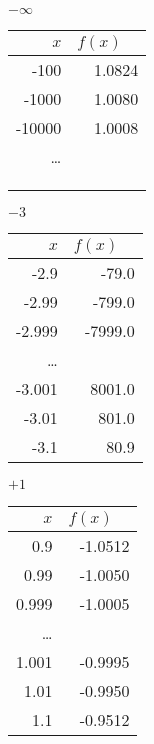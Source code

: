 \begin{esempio}
\begin{minipage}{.24\textwidth}
\begin{center}
\(-\infty\)\\
\begin{tabular}{r|r}
\(x\) & \(f(x)\quad\)\\\hline
-100 & 1.0824 \\
-1000 & 1.0080 \\
-10000 & 1.0008 \\
\dots \\
&\\
&\\
&
\end{tabular}
\end{center}
\end{minipage}
\begin{minipage}{.24\textwidth}
\begin{center}
\(-3\)\\
\begin{tabular}{r|r}
\(x\) & \(f(x)\quad\)\\\hline
-2.9 & -79.0 \\
-2.99 & -799.0 \\
-2.999 & -7999.0 \\
\dots \\
-3.001 & 8001.0 \\
-3.01 & 801.0 \\
-3.1 & 80.9 \\
\end{tabular}
\end{center}
\end{minipage}
\begin{minipage}{.24\textwidth}
\begin{center}
\(+1\)\\
\begin{tabular}{r|r}
\(x\) & \(f(x)\quad\)\\\hline
0.9 & -1.0512\\
0.99 & -1.0050 \\
0.999 & -1.0005 \\
\dots \\
1.001 & -0.9995 \\
1.01 & -0.9950 \\
1.1 & -0.9512 \\
\end{tabular}
\end{center}
\end{minipage}
\begin{minipage}{.24\textwidth}
\begin{center}

\end{center}
\end{minipage}
\end{esempio}
